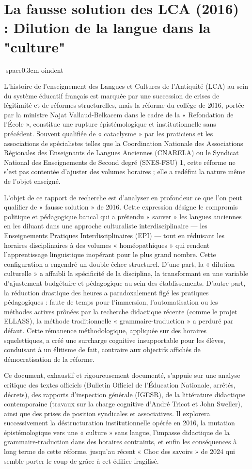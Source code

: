

\section{La fausse solution des LCA (2016) : Dilution de la langue dans la "culture"}
space{0.3cm}
oindent

L'histoire de l'enseignement des Langues et Cultures de l'Antiquité (LCA) au sein du système
éducatif français est marquée par une succession de crises de légitimité et de réformes
structurelles, mais la réforme du collège de 2016, portée par la ministre Najat Vallaud-Belkacem
dans le cadre de la « Refondation de l'École », constitue une rupture épistémologique et
institutionnelle sans précédent. Souvent qualifiée de « cataclysme » par les praticiens et les
associations de spécialistes telles que la Coordination Nationale des Associations Régionales des
Enseignants de Langues Anciennes (CNARELA) ou le Syndicat National des Enseignements de Second degré
(SNES-FSU) 1, cette réforme ne s'est pas contentée d'ajuster des volumes horaires ; elle a redéfini
la nature même de l'objet enseigné.

L'objet de ce rapport de recherche est d'analyser en profondeur ce que l'on peut qualifier de «
fausse solution » de 2016. Cette expression désigne le compromis politique et pédagogique bancal qui
a prétendu « sauver » les langues anciennes en les diluant dans une approche culturaliste
interdisciplinaire — les Enseignements Pratiques Interdisciplinaires (EPI) — tout en réduisant les
horaires disciplinaires à des volumes « homéopathiques » qui rendent l'apprentissage linguistique
inopérant pour le plus grand nombre. Cette configuration a engendré un double échec structurel.
D'une part, la « dilution culturelle » a affaibli la spécificité de la discipline, la transformant
en une variable d'ajustement budgétaire et pédagogique au sein des établissements. D'autre part, la
réduction drastique des heures a paradoxalement figé les pratiques pédagogiques : faute de temps
pour l'immersion, l'automatisation ou les méthodes actives prônées par la recherche didactique
récente (comme le projet ELLASS), la méthode traditionnelle « grammaire-traduction » a perduré par
défaut. Cette rémanence méthodologique, appliquée sur des horaires squelettiques, a créé une
surcharge cognitive insupportable pour les élèves, conduisant à un élitisme de fait, contraire aux
objectifs affichés de démocratisation de la réforme.

Ce document, exhaustif et rigoureusement documenté, s'appuie sur une analyse critique des textes
officiels (Bulletin Officiel de l'Éducation Nationale, arrêtés, décrets), des rapports d'inspection
générale (IGESR), de la littérature didactique contemporaine (travaux sur la charge cognitive
d'André Tricot et John Sweller), ainsi que des prises de position syndicales et associatives. Il
explorera successivement la déstructuration institutionnelle opérée en 2016, la mutation
épistémologique vers une « culture » sans langue, l'impasse didactique de la grammaire-traduction
dans des horaires contraints, et enfin les conséquences à long terme de cette réforme, jusqu'au
récent « Choc des savoirs » de 2024 qui semble porter le coup de grâce à cet édifice fragilisé.

